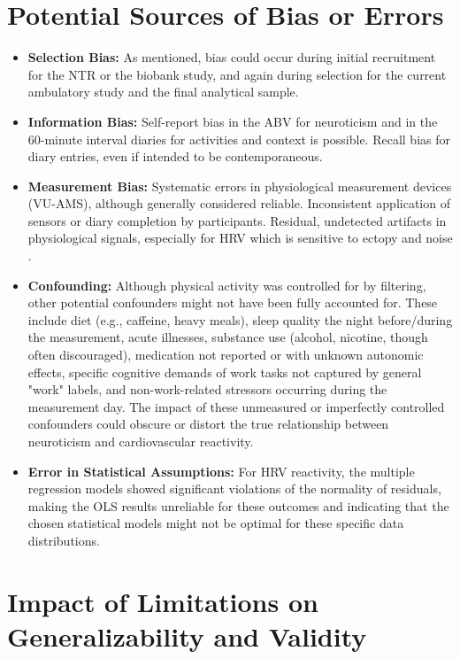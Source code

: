 \documentclass[11pt, a4paper]{report}
\begin{document}
\section{Potential Sources of Bias or Errors}
\label{sec:limitations_bias_chap} %

\begin{itemize}
    \item \textbf{Selection Bias:} As mentioned, bias could occur during initial recruitment for the NTR or the biobank study, and again during selection for the current ambulatory study and the final analytical sample.
    \item \textbf{Information Bias:}
        Self-report bias in the ABV for neuroticism and in the 60-minute interval diaries for activities and context is possible.
        Recall bias for diary entries, even if intended to be contemporaneous.
    \item \textbf{Measurement Bias:}
        Systematic errors in physiological measurement devices (VU-AMS), although generally considered reliable.
        Inconsistent application of sensors or diary completion by participants.
        Residual, undetected artifacts in physiological signals, especially for HRV which is sensitive to ectopy and noise \cite{deGeusGevonden2024}.
    \item \textbf{Confounding:}
        Although physical activity was controlled for by filtering, other potential confounders might not have been fully accounted for. These include diet (e.g., caffeine, heavy meals), sleep quality the night before/during the measurement, acute illnesses, substance use (alcohol, nicotine, though often discouraged), medication not reported or with unknown autonomic effects, specific cognitive demands of work tasks not captured by general "work" labels, and non-work-related stressors occurring during the measurement day.
        The impact of these unmeasured or imperfectly controlled confounders could obscure or distort the true relationship between neuroticism and cardiovascular reactivity.
    \item \textbf{Error in Statistical Assumptions:} For HRV reactivity, the multiple regression models showed significant violations of the normality of residuals, making the OLS results unreliable for these outcomes and indicating that the chosen statistical models might not be optimal for these specific data distributions.
\end{itemize}

\section{Impact of Limitations on Generalizability and Validity}
\label{sec:limitations_impact_chap} %
\end{document}
